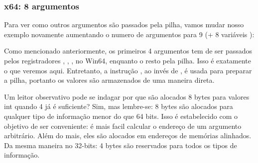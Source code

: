\subsubsection{x64: 8 argumentos}

\label{example_printf8_x64}
Para ver como outros argumentos são passados pela pilha,
vamos mudar nosso exemplo novamente aumentando o numero de argumentos para 9 (\printf + 8 variáveis \Tint):




Como mencionado anteriormente, os primeiros 4 argumentos tem de ser passados pelos registradores \RCX, \RDX, ,  no Win64, enquanto o resto pela pilha.
Isso é exatamente o que veremos aqui.
Entretanto, a instrução \MOV, ao invés de \PUSH, é usada para preparar a pilha, portanto os valores são armazenados de uma maneira direta.



Um leitor observativo pode se indagar por que são alocados 8 bytes para valores int quando 4 já é suficiente?
Sim, mas lembre-se: 8 bytes são alocados para qualquer tipo de informação menor do que 64 bits.
Isso é estabelecido com o objetivo de ser conveniente: é mais facil calcular o endereço de um argumento arbitrário.
Além do mais, eles são alocados em endereços de memórias alinhados. Da mesma maneira no 32-bits: 4 bytes são reservados para todos os tipos de informação.


\PTBRph{}

